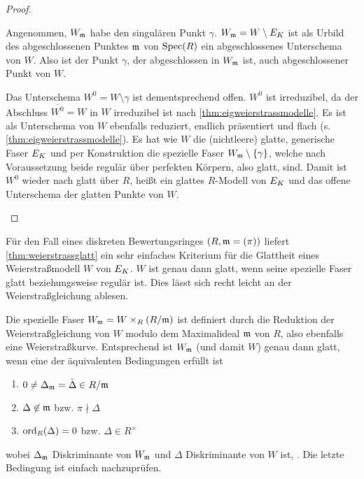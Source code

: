 \begin{Satz}
\begin{proof}
\begin{enumerate}[resume*,start=1]
      Angenommen, $W_{\mathfrak{m}}$ habe den singulären Punkt $\gamma$.
      $W_{\mathfrak{m}}=W\setminus E_{K}$ ist als Urbild des abgeschlossenen Punktes
      $\mathfrak{m}$ von $\operatorname{Spec}(R)$ ein abgeschlossenes Unterschema von $W$.
      Also ist der Punkt $\gamma$, der abgeschlossen in $W_{\mathfrak{m}}$ ist, auch
      abgeschlossener Punkt von $W$.
      
      Das Unterschema $W^0=W\setminus\gamma$ ist dementsprechend offen.
      $W^0$ ist irreduzibel, da der Abschluss $\overline{W^0}=W$ in
      $W$ irreduzibel ist nach \ref{thm:eigweierstrassmodelle}.
      Es ist als Unterschema von $W$ ebenfalls reduziert, endlich
      präsentiert und flach (s. \ref{thm:eigweierstrassmodelle}).
      Es hat wie $W$ die (nichtleere) glatte, generische Faser $E_{K}$ und
      per Konstruktion die spezielle Faser ${W_{\mathfrak{m}}\setminus\{\gamma\}}$,
      welche nach Voraussetzung beide regulär über perfekten Körpern,
      also glatt, sind.
      Damit ist $W^0$ wieder nach \cite[Proposition~8.5/17]{bosch}
      glatt über $R$, heißt ein glattes $R$-Modell von $E_{K}$ und das
      offene Unterschema der glatten Punkte von $W$.
      \qedhere
    \end{enumerate}
  \end{proof}
\end{Satz}

\begin{Bemerkung}\label{thm:weierstraßmodellglatt}
  Für den Fall eines diskreten Bewertungsringes $(R,\mathfrak{m}=(\pi))$ liefert
  \ref{thm:weierstrassglatt} ein sehr einfaches Kriterium für die
  Glattheit eines Weierstraßmodell $W$ von $E_{K}$.
  $W$ ist genau dann glatt, wenn seine spezielle Faser glatt
  beziehungsweise regulär ist.
  Dies lässt sich recht leicht an der Weierstraßgleichung ablesen.
  
  Die spezielle Faser $W_{\mathfrak{m}}=W\times_R (R/\mathfrak{m})$ ist definiert
  durch die Reduktion der Weierstraßgleichung von $W$ modulo dem
  Maximalideal $\mathfrak{m}$ von $R$, also ebenfalls eine Weierstraßkurve.
  Entsprechend ist $W_{\mathfrak{m}}$ (und damit $W$) genau dann glatt, wenn
  eine der äquivalenten Bedingungen erfüllt ist
  \begin{enumerate}[label=(\roman*)]
  \item $0\neq\Delta_{\mathfrak{m}}=\bar\Delta\in R/\mathfrak{m}$
  \item $\Delta\not\in\mathfrak{m}$ bzw. $\pi\nmid\Delta$
  \item $\operatorname{ord}_R(\Delta)=0$ bzw. $\Delta\in R^\times$
  \end{enumerate}
  wobei $\Delta_{\mathfrak{m}}$ Diskriminante von $W_{\mathfrak{m}}$ und $\Delta$
  Diskriminante von $W$ ist,
  \cite[vgl.][Proposition~VII.5.1~(a)]{silverman}.
  Die letzte Bedingung ist einfach nachzuprüfen.
\end{Bemerkung}

